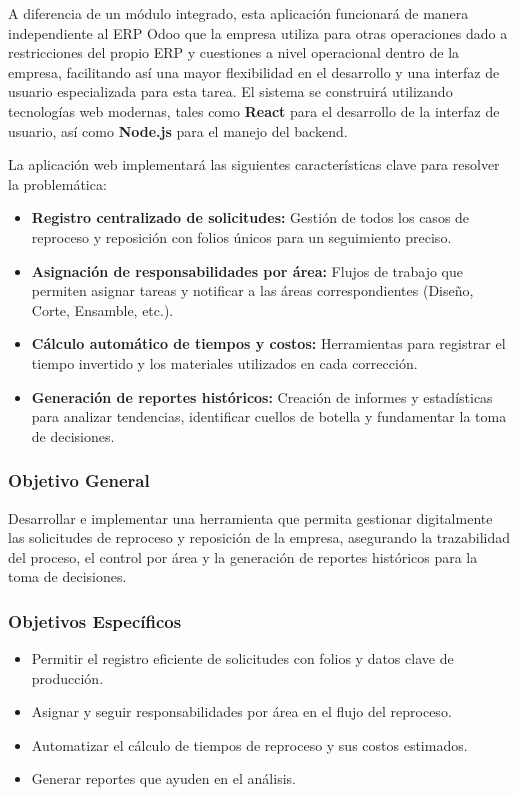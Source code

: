 \documentclass[12pt,letterpaper,spanish]{report}
\begin{document}
A diferencia de un módulo integrado, esta aplicación funcionará de manera independiente al ERP Odoo que la empresa utiliza para otras operaciones dado a restricciones del propio ERP y cuestiones a nivel operacional dentro de la empresa, facilitando así una mayor flexibilidad en el desarrollo y una interfaz de usuario especializada para esta tarea. El sistema se construirá utilizando tecnologías web modernas, tales como \textbf{React} para el desarrollo de la interfaz de usuario, así como \textbf{Node.js} para el manejo del backend.

La aplicación web implementará las siguientes características clave para resolver la problemática:
\begin{itemize}
    \item \textbf{Registro centralizado de solicitudes:} Gestión de todos los casos de reproceso y reposición con folios únicos para un seguimiento preciso.
    \item \textbf{Asignación de responsabilidades por área:} Flujos de trabajo que permiten asignar tareas y notificar a las áreas correspondientes (Diseño, Corte, Ensamble, etc.).
    \item \textbf{Cálculo automático de tiempos y costos:} Herramientas para registrar el tiempo invertido y los materiales utilizados en cada corrección.
    \item \textbf{Generación de reportes históricos:} Creación de informes y estadísticas para analizar tendencias, identificar cuellos de botella y fundamentar la toma de decisiones.
\end{itemize}

\subsubsection{Objetivo General}
\label{sec:objetivo_general}

Desarrollar e implementar una herramienta que permita gestionar digitalmente las solicitudes de reproceso y reposición de la empresa, asegurando la trazabilidad del proceso, el control por área y la generación de reportes históricos para la toma de decisiones.

\subsubsection{Objetivos Específicos}
\label{sec:objetivos_especificos}

\begin{itemize}
    \item Permitir el registro eficiente de solicitudes con folios y datos clave de producción.
    \item Asignar y seguir responsabilidades por área en el flujo del reproceso.
    \item Automatizar el cálculo de tiempos de reproceso y sus costos estimados.
    \item Generar reportes que ayuden en el análisis.
\end{itemize}
\end{document}
